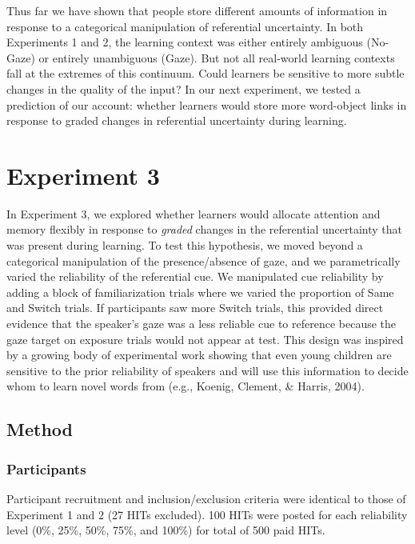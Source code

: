 \documentclass[oneside]{report}
\begin{document}
Thus far we have shown that people store different amounts of
information in response to a categorical manipulation of referential
uncertainty. In both Experiments 1 and 2, the learning context was
either entirely ambiguous (No-Gaze) or entirely unambiguous (Gaze). But
not all real-world learning contexts fall at the extremes of this
continuum. Could learners be sensitive to more subtle changes in the
quality of the input? In our next experiment, we tested a prediction of
our account: whether learners would store more word-object links in
response to graded changes in referential uncertainty during learning.

\hypertarget{experiment-3}{%
\section{Experiment 3}\label{experiment-3}}

In Experiment 3, we explored whether learners would allocate attention
and memory flexibly in response to \emph{graded} changes in the
referential uncertainty that was present during learning. To test this
hypothesis, we moved beyond a categorical manipulation of the
presence/absence of gaze, and we parametrically varied the reliability
of the referential cue. We manipulated cue reliability by adding a block
of familiarization trials where we varied the proportion of Same and
Switch trials. If participants saw more Switch trials, this provided
direct evidence that the speaker's gaze was a less reliable cue to
reference because the gaze target on exposure trials would not appear at
test. This design was inspired by a growing body of experimental work
showing that even young children are sensitive to the prior reliability
of speakers and will use this information to decide whom to learn novel
words from (e.g., Koenig, Clement, \& Harris, 2004).

\hypertarget{method-2}{%
\subsection{Method}\label{method-2}}

\hypertarget{participants-2}{%
\subsubsection{Participants}\label{participants-2}}

Participant recruitment and inclusion/exclusion criteria were identical
to those of Experiment 1 and 2 (27 HITs excluded). 100 HITs were posted
for each reliability level (0\%, 25\%, 50\%, 75\%, and 100\%) for total
of 500 paid HITs.
\end{document}
